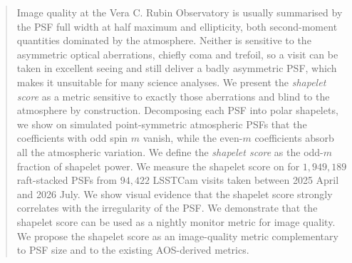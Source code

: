 \documentclass[]{spie}
\begin{document}
\begin{abstract}
Image quality at the Vera C. Rubin Observatory is usually summarised by the PSF full width
at half maximum and ellipticity, both second-moment quantities dominated by the atmosphere.
Neither is sensitive to the asymmetric optical aberrations, chiefly coma and trefoil, so a visit can be taken in excellent seeing and still deliver a badly asymmetric PSF, which makes it unsuitable for many science analyses.  
We present the \emph{shapelet score} as a metric sensitive to exactly those aberrations
and blind to the atmosphere by construction. Decomposing each PSF into polar shapelets, we
show on simulated point-symmetric atmospheric PSFs that the coefficients with odd spin $m$
vanish, while the even-$m$ coefficients absorb all
the atmospheric variation. We define the \emph{shapelet score} as the odd-$m$ fraction of
shapelet power.
We measure the shapelet score on for $1{,}949{,}189$ raft-stacked PSFs from $94{,}422$ LSSTCam visits taken between 2025 April and 2026 July. 
We show visual evidence that the shapelet score strongly correlates with the irregularity of the PSF. We demonstrate that the shapelet score can be used as a nightly monitor metric for image quality. 
We propose the shapelet score as an image-quality metric complementary to PSF size and to the existing AOS-derived metrics.
\end{abstract}



\end{document}
